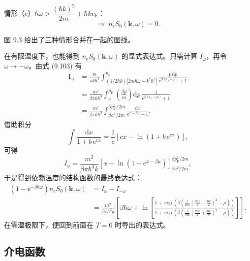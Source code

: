 情形（c）$\hbar\omega>\dfrac{(\hbar k)^2}{2m}+\hbar kv_{\mathrm{F}}$：
\begin{equation*}
\Rightarrow\; n_{\mathrm{e}}S_0(\mathbf{k},\omega)=0.\tag{9.112}
\end{equation*}

图 9.3 给出了三种情形合并在一起的图线。

在有限温度下，也能得到 $n_{\mathrm{e}}S_0(\mathbf{k},\omega)$ 的显式表达式。只需计算 $I_{\omega}$，再令 $\omega\to-\omega$。由式 (9.103) 有
\begin{equation*}
\begin{aligned}
\mathrm{I}_{\omega}&=\frac{m}{\pi k\hbar^3}\int_{(1/2\hbar k)\left|2m\hbar\omega-k^2\hbar^2\right|}^{p_{\mathrm{F}}}\frac{p\,\mathrm{d}p}{\mathrm{e}^{\beta(\epsilon_{\mathrm{p}}-\mu)}+1}\\
&=\frac{m^2}{\beta\pi k\hbar^3}\int_{a}^{p_{\mathrm{F}}}\left(\frac{\beta p}{m}\right)\mathrm{d}p\,\frac{1}{\mathrm{e}^{\beta(\epsilon_{\mathrm{p}}-\mu)}+1}\\
&=\frac{m^2}{\beta\pi k\hbar^3}\int_{\beta a^2/2m}^{\beta p_{\mathrm{F}}^2/2m}\frac{\mathrm{d}x}{\mathrm{e}^{x-\beta\mu}+1}.
\end{aligned}\tag{9.113}
\end{equation*}
借助积分
\begin{equation*}
\int\frac{\mathrm{d}x}{1+b\,\mathrm{e}^{cx}}=\frac{1}{c}\left[cx-\ln(1+b\,\mathrm{e}^{cx})\right],\tag{9.114}
\end{equation*}
可得
\begin{equation*}
I_{\omega}=\frac{m^2}{\beta\pi\hbar^3 k}\left[x-\ln(1+\mathrm{e}^{x-\beta\mu})\right]_{\beta a^2/2m}^{\beta p_{\mathrm{F}}^2/2m},\tag{9.115}
\end{equation*}
于是得到依赖温度的结构函数的最终表达式：
\begin{equation*}
\begin{aligned}
\left(1-\mathrm{e}^{-\beta\hbar\omega}\right)n_{\mathrm{e}}S_0(\mathbf{k},\omega)&=I_{\omega}-I_{-\omega}\\
&=\frac{m^2}{\beta\pi\hbar^3 k}\left[\beta\hbar\omega+\ln\left[\frac{1+\exp\left(\beta\left(\frac{1}{2m}\left(\frac{m\omega}{k}-\frac{\hbar k}{2}\right)^{2}-\mu\right)\right)}{1+\exp\left(\beta\left(\frac{1}{2m}\left(\frac{m\omega}{k}+\frac{\hbar k}{2}\right)^{2}-\mu\right)\right)}\right]\right].
\end{aligned}
\end{equation*}
在零温极限下，便回到前面在 $T=0$ 时导出的表达式。

\subsection{介电函数}

